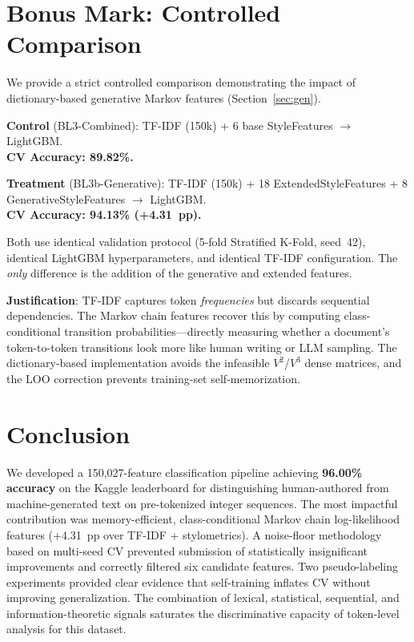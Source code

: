 \documentclass[11pt]{article}
\begin{document}
\section{Bonus Mark: Controlled Comparison}

We provide a strict controlled comparison demonstrating the impact of dictionary-based generative Markov features (Section~\ref{sec:gen}).

\textbf{Control} (BL3-Combined): TF-IDF (150k) + 6 base StyleFeatures $\to$ LightGBM.\\
\textbf{CV Accuracy: 89.82\%.}

\textbf{Treatment} (BL3b-Generative): TF-IDF (150k) + 18 ExtendedStyleFeatures + 8 GenerativeStyleFeatures $\to$ LightGBM.\\
\textbf{CV Accuracy: 94.13\% (+4.31~pp).}

Both use identical validation protocol (5-fold Stratified K-Fold, seed~42), identical LightGBM hyperparameters, and identical TF-IDF configuration. The \textit{only} difference is the addition of the generative and extended features.

\textbf{Justification}: TF-IDF captures token \textit{frequencies} but discards sequential dependencies. The Markov chain features recover this by computing class-conditional transition probabilities---directly measuring whether a document's token-to-token transitions look more like human writing or LLM sampling. The dictionary-based implementation avoids the infeasible $V^2$/$V^3$ dense matrices, and the LOO correction prevents training-set self-memorization.

\section{Conclusion}

We developed a 150,027-feature classification pipeline achieving \textbf{96.00\% accuracy} on the Kaggle leaderboard for distinguishing human-authored from machine-generated text on pre-tokenized integer sequences. The most impactful contribution was memory-efficient, class-conditional Markov chain log-likelihood features (+4.31~pp over TF-IDF + stylometrics). A noise-floor methodology based on multi-seed CV prevented submission of statistically insignificant improvements and correctly filtered six candidate features. Two pseudo-labeling experiments provided clear evidence that self-training inflates CV without improving generalization. The combination of lexical, statistical, sequential, and information-theoretic signals saturates the discriminative capacity of token-level analysis for this dataset.
\end{document}
